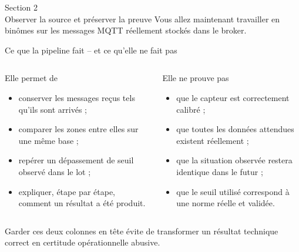 \documentclass[aspectratio=169]{beamer}
\begin{document}
\begin{frame}[plain]
  \centering
  \Huge Section 2\\[3mm]
  \Large Observer la source et préserver la preuve
  \vfill
  \normalsize Vous allez maintenant travailler en binômes sur les messages MQTT réellement stockés dans le broker.
\end{frame}

\begin{frame}{Ce que la pipeline fait -- et ce qu'elle ne fait pas}
  \begin{columns}[T]
    \begin{block}{Elle permet de}
      \begin{itemize}
        \item conserver les messages reçus tels qu'ils sont arrivés ;
        \item comparer les zones entre elles sur une même base ;
        \item repérer un dépassement de seuil observé dans le lot ;
        \item expliquer, étape par étape, comment un résultat a été produit.
      \end{itemize}
    \end{block}
    \begin{alertblock}{Elle ne prouve pas}
      \begin{itemize}
        \item que le capteur est correctement calibré ;
        \item que toutes les données attendues existent réellement ;
        \item que la situation observée restera identique dans le futur ;
        \item que le seuil utilisé correspond à une norme réelle et validée.
      \end{itemize}
    \end{alertblock}
  \end{columns}
  \vfill
  \normalsize Garder ces deux colonnes en tête évite de transformer un résultat technique correct en certitude opérationnelle abusive.
\end{frame}
\end{document}
